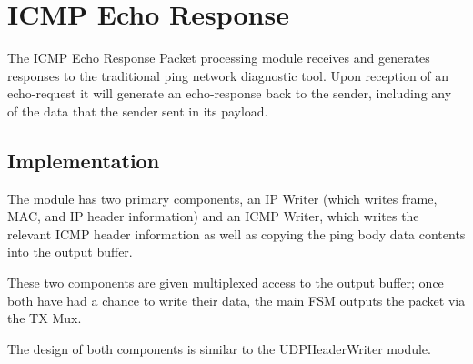 \section{ICMP Echo Response}
The ICMP Echo Response Packet processing module receives and generates
responses to the traditional ping network diagnostic tool. Upon
reception of an echo-request it will generate an echo-response back to
the sender, including any of the data that the sender sent in its
payload.

\subsection{Implementation}
The module has two primary components, an IP Writer (which writes
frame, MAC, and IP header information) and an ICMP Writer, which
writes the relevant ICMP header information as well as copying the
ping body data contents into the output buffer.

These two components are given multiplexed access to the output
buffer; once both have had a chance to write their data, the main FSM
outputs the packet via the TX Mux.

The design of both components is similar to the UDPHeaderWriter module. 

